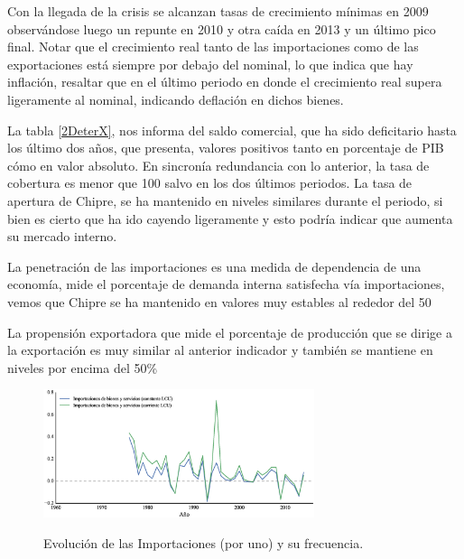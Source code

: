 \documentclass[a4paper,openright,12pt]{book}
\begin{document}
Con la llegada de la crisis se alcanzan tasas de crecimiento mínimas en 2009 observándose luego un repunte en 2010 y otra caída en 2013 y un último pico final.
Notar que el crecimiento real tanto de las importaciones como de las exportaciones está siempre por debajo del nominal, lo que indica que hay inflación, resaltar que en el último periodo en donde el crecimiento real supera ligeramente al nominal, indicando deflación en dichos bienes.

La tabla \ref{2DeterX}, nos informa del saldo comercial, que ha sido deficitario hasta los último dos años, que presenta, valores positivos tanto en porcentaje de PIB cómo en valor absoluto. En sincronía  redundancia con lo anterior, la tasa de cobertura es menor que 100 salvo en los dos últimos periodos. La tasa de apertura de Chipre, se ha mantenido en niveles similares durante el periodo, si bien es cierto que ha ido cayendo ligeramente y esto podría indicar que aumenta su mercado interno.

La penetración de las importaciones es una medida de dependencia de una economía, mide el porcentaje de demanda interna satisfecha vía importaciones, vemos que Chipre se ha mantenido en valores muy estables al rededor del 50%

La propensión exportadora que mide el porcentaje de producción que se dirige a la exportación es muy similar al anterior indicador y también se mantiene en niveles por encima del 50\%

\begin{figure}[ht]
    \caption{Evolución de las Importaciones (por uno) y su frecuencia.}
    \centering
    \includegraphics[width=300px]{ev_m}
    \label{ev_m}
\end{figure}
\end{document}
